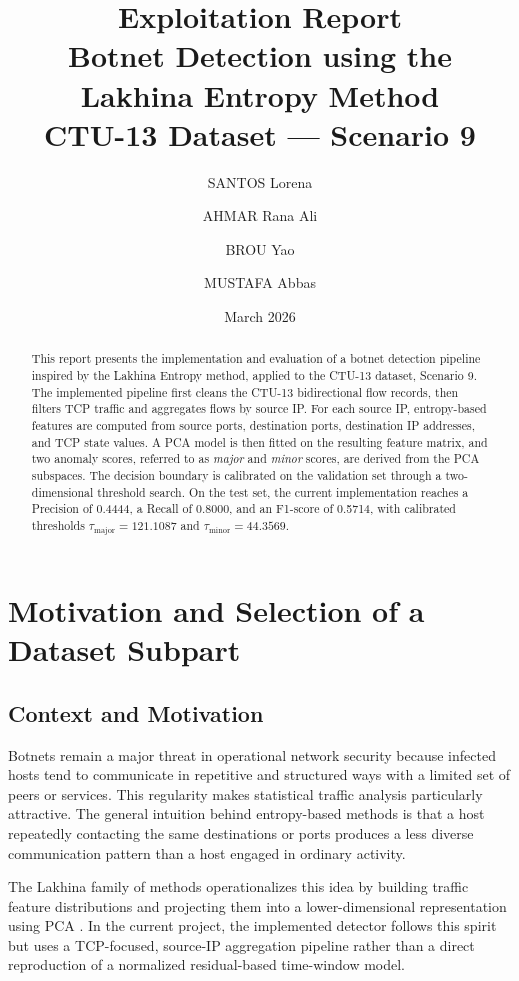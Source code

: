 \documentclass{article}
\title{Exploitation Report\\
\large Botnet Detection using the Lakhina Entropy Method\\
CTU-13 Dataset --- Scenario 9}
\author{
  SANTOS Lorena \and
  AHMAR Rana Ali \and
  BROU Yao \and
  MUSTAFA Abbas
}
\date{March 2026}
\begin{document}
\maketitle

\begin{abstract}
This report presents the implementation and evaluation of a botnet detection pipeline inspired by the Lakhina Entropy method, applied to the CTU-13 dataset, Scenario 9. The implemented pipeline first cleans the CTU-13 bidirectional flow records, then filters TCP traffic and aggregates flows by source IP. For each source IP, entropy-based features are computed from source ports, destination ports, destination IP addresses, and TCP state values. A PCA model is then fitted on the resulting feature matrix, and two anomaly scores, referred to as \emph{major} and \emph{minor} scores, are derived from the PCA subspaces. The decision boundary is calibrated on the validation set through a two-dimensional threshold search. On the test set, the current implementation reaches a Precision of 0.4444, a Recall of 0.8000, and an F1-score of 0.5714, with calibrated thresholds $\tau_{\text{major}} = 121.1087$ and $\tau_{\text{minor}} = 44.3569$.
\end{abstract}

\section{Motivation and Selection of a Dataset Subpart}

\subsection{Context and Motivation}

Botnets remain a major threat in operational network security because infected hosts tend to communicate in repetitive and structured ways with a limited set of peers or services. This regularity makes statistical traffic analysis particularly attractive. The general intuition behind entropy-based methods is that a host repeatedly contacting the same destinations or ports produces a less diverse communication pattern than a host engaged in ordinary activity.

The Lakhina family of methods operationalizes this idea by building traffic feature distributions and projecting them into a lower-dimensional representation using PCA \cite{lakhina2005}. In the current project, the implemented detector follows this spirit but uses a TCP-focused, source-IP aggregation pipeline rather than a direct reproduction of a normalized residual-based time-window model.
\end{document}
